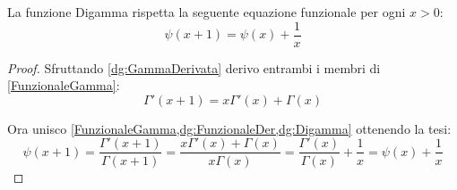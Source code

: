 \begin{theorem}\label{dg:DigammaFunzionale}
	La funzione Digamma rispetta la seguente equazione funzionale per ogni $x>0$:
	\begin{equation*}
		\psi(x+1)=\psi(x)+\frac 1x
	\end{equation*}
\end{theorem}
\begin{proof}
	Sfruttando \cref{dg:GammaDerivata} derivo entrambi i membri di \cref{FunzionaleGamma}:
	\begin{equation}\label{dg:FunzionaleDer}
		\Gamma'(x+1)=x\Gamma'(x)+\Gamma(x)
	\end{equation}
	
	Ora unisco \cref{FunzionaleGamma,dg:FunzionaleDer,dg:Digamma} ottenendo la tesi:
	\begin{equation*}
		\psi(x+1)=\frac{\Gamma'(x+1)}{\Gamma(x+1)}=\frac{x\Gamma'(x)+\Gamma(x)}{x\Gamma(x)}=
		\frac{\Gamma'(x)}{\Gamma(x)}+\frac 1x=\psi(x)+\frac 1x
	\end{equation*}
\end{proof}

